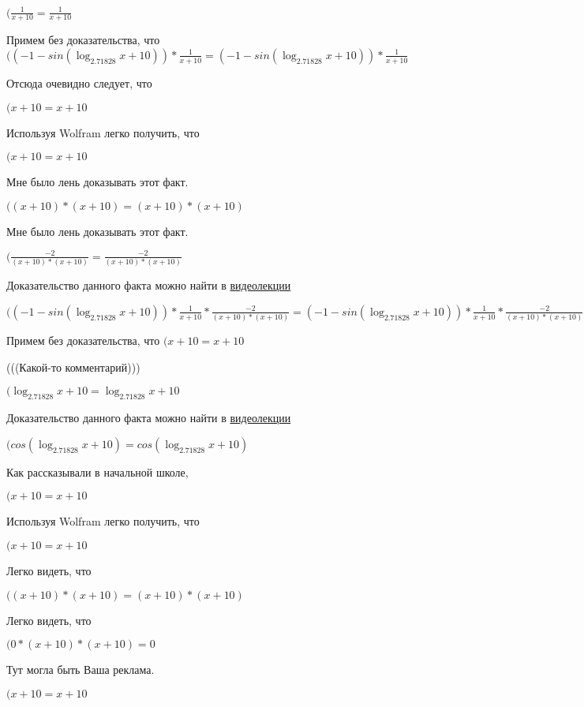\documentclass[12pt,a4paper,fleqn]{article}
\theoremstyle{definition}
\begin{document}
$(\frac{ 1 }{ x  +  10 }
 = \frac{ 1 }{ x  +  10 }
$

Примем без доказательства, что
$(( -1  - sin(\log_{ 2.71828 }{ x  +  10 })) * \frac{ 1 }{ x  +  10 }
 = ( -1  - sin(\log_{ 2.71828 }{ x  +  10 })) * \frac{ 1 }{ x  +  10 }
$

Отсюда очевидно следует, что

$( x  +  10  =  x  +  10 $

Используя Wolfram легко получить, что

$( x  +  10  =  x  +  10 $

Мне было лень доказывать этот факт.

$(( x  +  10 ) * ( x  +  10 ) = ( x  +  10 ) * ( x  +  10 )$

Мне было лень доказывать этот факт.

$(\frac{ -2 }{( x  +  10 ) * ( x  +  10 )}
 = \frac{ -2 }{( x  +  10 ) * ( x  +  10 )}
$

Доказательство данного факта можно найти в \href{https://www.youtube.com/watch?v=dQw4w9WgXcQ}{видеолекции}

$(( -1  - sin(\log_{ 2.71828 }{ x  +  10 })) * \frac{ 1 }{ x  +  10 }
 * \frac{ -2 }{( x  +  10 ) * ( x  +  10 )}
 = ( -1  - sin(\log_{ 2.71828 }{ x  +  10 })) * \frac{ 1 }{ x  +  10 }
 * \frac{ -2 }{( x  +  10 ) * ( x  +  10 )}
$

Примем без доказательства, что
$( x  +  10  =  x  +  10 $

(((Какой-то комментарий)))

$(\log_{ 2.71828 }{ x  +  10 } = \log_{ 2.71828 }{ x  +  10 }$

Доказательство данного факта можно найти в \href{https://www.youtube.com/watch?v=dQw4w9WgXcQ}{видеолекции}

$(cos(\log_{ 2.71828 }{ x  +  10 }) = cos(\log_{ 2.71828 }{ x  +  10 })$

Как рассказывали в начальной школе,

$( x  +  10  =  x  +  10 $

Используя Wolfram легко получить, что

$( x  +  10  =  x  +  10 $

Легко видеть, что

$(( x  +  10 ) * ( x  +  10 ) = ( x  +  10 ) * ( x  +  10 )$

Легко видеть, что

$( 0  * ( x  +  10 ) * ( x  +  10 ) =  0 $

Тут могла быть Ваша реклама.

$( x  +  10  =  x  +  10 $
\end{document}
